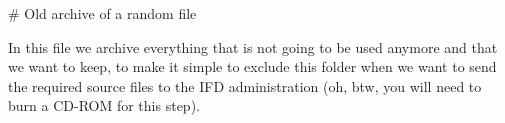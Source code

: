 # Old archive of a random file

In this file we archive everything that is not going to be used anymore 
and that we want to keep,
to make it simple to exclude this folder when we want to send the required 
source files to the IFD administration 
(oh, btw, you will need to burn a CD-ROM for this step).